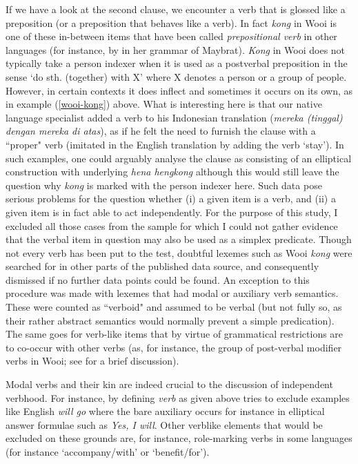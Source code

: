 If we have a look at the second clause, we encounter a verb that is glossed like a preposition (or a preposition that behaves like a verb). In fact \textit{kong} in Wooi is one of these in-between items that have been called \textit{prepositional verb} in other languages (for instance, by \citet{dol2007grammar} in her grammar of Maybrat). \textit{Kong} in Wooi does not typically take a person indexer when it is used as a postverbal preposition in the sense `do sth. (together) with X' where X denotes a person or a group of people. However, in certain contexts it does inflect and sometimes it occurs on its own, as in example (\ref{wooi-kong}) above. What is interesting here is that our native language specialist added a verb to his Indonesian translation (\textit{mereka (tinggal) dengan mereka di atas}), as if he felt the need to furnish the clause with a ``proper" verb (imitated in the English translation by adding the verb `stay'). In such examples, one could arguably analyse the clause as consisting of an elliptical construction with underlying \textit{hena hengkong} although this would still leave the question why \textit{kong} is marked with the person indexer here. Such data pose serious problems for the question whether (i) a given item is a verb, and (ii) a given item is in fact able to act independently. For the purpose of this study, I excluded all those cases from the sample for which I could not gather evidence that the verbal item in question may also be used as a simplex predicate. Though not every verb has been put to the test, doubtful lexemes such as Wooi \textit{kong} were searched for in other parts of the published data source, and consequently dismissed if no further data points could be found. An exception to this procedure was made with lexemes that had modal or auxiliary verb semantics. These were counted as ``verboid" and assumed to be verbal (but not fully so, as their rather abstract semantics would normally prevent a simple predication). The same goes for verb-like items that by virtue of grammatical restrictions are to co-occur with other verbs (as, for instance, the group of post-verbal modifier verbs in Wooi; see  for a brief discussion).

Modal verbs and their kin are indeed crucial to the discussion of independent verbhood. For instance, by defining \textit{verb} as given above \citet{haspelmath2016serial} tries to exclude examples like English \textit{will go} where the bare auxiliary occurs for instance in elliptical answer formulae such as \textit{Yes, I will}. Other verblike elements that would be excluded on these grounds are, for instance, role-marking verbs in some languages (for instance `accompany/with' or `benefit/for'). 

